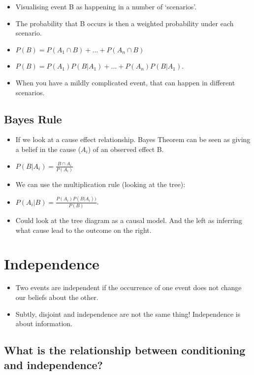 \documentclass[11pt]{article}
\begin{document}
\begin{itemize}
\tightlist
\item
  Visualising event B as happening in a number of `scenarios'.
\item
  The probability that B occurs is then a weighted probability under
  each scenario.
\item
  \(P(B) = P(A_1 \cap B) + ... + P(A_n \cap B)\)
\item
  \(P(B) = P(A_1)P(B|A_1) + ... + P(A_n)P(B|A_1)\).
\item
  When you have a mildly complicated event, that can happen in different
  scenarios.
\end{itemize}

\hypertarget{bayes-rule}{%
\subsection{Bayes Rule}\label{bayes-rule}}

\begin{itemize}
\tightlist
\item
  If we look at a cause effect relationship. Bayes Theorem can be seen
  as giving a belief in the cause (\(A_i\)) of an observed effect B.
\item
  \(P(B|A_i) = \frac{B \cap A_i}{P(A_i)}\)
\item
  We can use the multiplication rule (looking at the tree):
\item
  \(P(A_i|B) = \frac{P(A_i)P(B|A_i))}{P(B)}\).
\item
  Could look at the tree diagram as a causal model. And the left as
  inferring what cause lead to the outcome on the right.
\end{itemize}

\hypertarget{independence}{%
\section{Independence}\label{independence}}

\begin{itemize}
\tightlist
\item
  Two events are independent if the occurrence of one event does not
  change our beliefs about the other.
\item
  Subtly, disjoint and independence are not the same thing! Independence
  is about information.
\end{itemize}

\hypertarget{what-is-the-relationship-between-conditioning-and-independence}{%
\subsection{What is the relationship between conditioning and
independence?}\label{what-is-the-relationship-between-conditioning-and-independence}}
\end{document}
